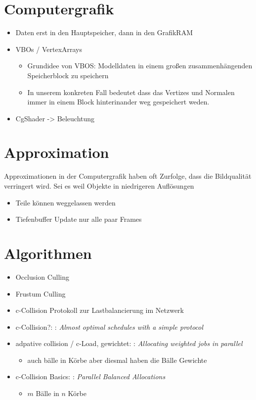 \section{Computergrafik}
\label{sec:basics:computergrafik}

\begin{itemize}
 \item Daten erst in den Hauptspeicher, dann in den GrafikRAM
 \item VBOs / VertexArrays
 \begin{itemize}
  \item Grundidee von VBOS: Modelldaten in einem großen zusammenhängenden Speicherblock zu speichern
  \item In unserem konkreten Fall bedeutet dass das Vertizes und Normalen immer in einem Block hinterinander weg gespeichert weden.
 \end{itemize}
 \item CgShader -> Beleuchtung
\end{itemize}

\section{Approximation}
\label{sec:basics:approximation}
Approximationen in der Computergrafik haben oft  Zurfolge, dass die Bildqualität verringert wird. Sei es weil Objekte in niedrigeren Auflösungen
\begin{itemize}
 \item Teile können weggelassen werden
 \item Tiefenbuffer Update nur alle paar Frames
\end{itemize}

\section{Algorithmen}
\label{sec:basics:algorithmen}
\begin{itemize}
 \item Occlusion Culling \cite{RTR3}
 \item Frustum Culling \cite{RTR3}
 \item c-Collision Protokoll zur Lastbalancierung im Netzwerk
 \item c-Collision?: \cite{DBLP:conf/arcs/RehbergS99}: \textit{Almost optimal schedules with a simple protocol}
 \item adpative collision / c-Load, gewichtet: \cite{ccol2}: \textit{Allocating weighted jobs in parallel}
 \begin{itemize}
  \item auch bälle in Körbe aber diesmal haben die Bälle Gewichte
 \end{itemize}

 \item c-Collision Basics: \cite{ccol3}: \textit{Parallel Balanced Allocations}
 \begin{itemize}
  \item $m$ Bälle in $n$ Körbe
 \end{itemize}
\end{itemize}

